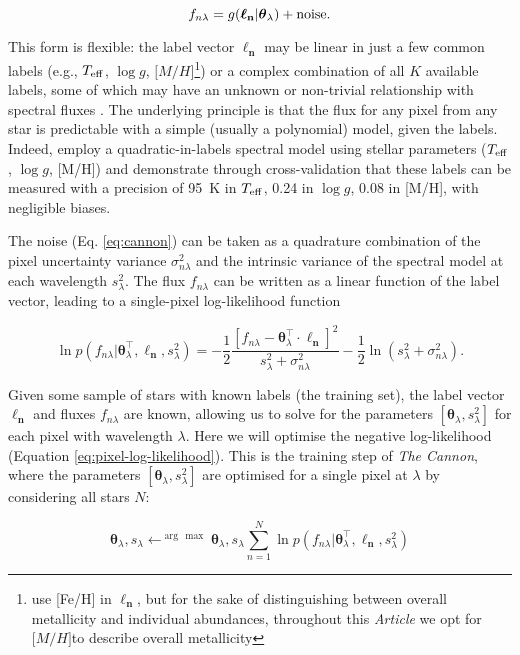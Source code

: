 \documentclass[useAMS,usenatbib]{mn2e}
\newcommand\article{\textit{Article}}
\newcommand\tc{\textit{The Cannon}}
\newcommand\lv{\mathbf{\boldsymbol\ell_n}}
\newcommand\cv{{\boldsymbol\theta}_\lambda}
\newcommand\given{|}
\newcommand\teff{$T_{\rm eff}$}
\newcommand\logg{$\log{g}$}
\newcommand\mh{${\mathrm [M/H]}$}
\begin{document}
\begin{equation}
    f_{n\lambda} = g(\lv\given\cv) + {\rm noise}.
    \label{eq:cannon}
\end{equation}

This form is flexible: the label vector $\lv$ may be linear in just a few common
labels (e.g., \teff, \logg, \mh\footnote{\citet{Ness15a} use [Fe/H] in $\lv$, but for the 
sake of distinguishing between overall metallicity and individual abundances,
throughout this \article{} we opt for \mh to describe overall metallicity})
or a complex combination of all $K$ available labels, some of which may have an
 unknown or non-trivial relationship with spectral fluxes \citep[e.g., ages, 
 masses, see][]{Nissen15, Ness15b}. The underlying principle
is that the flux for any pixel from any star is predictable with a simple (usually
 a polynomial) model, given the labels. Indeed, \citet{Ness15a}
employ a quadratic-in-labels spectral model using stellar
parameters ($T_{\rm eff}$, $\log{g}$, [M/H])
and demonstrate through cross-validation that these labels can be 
measured with a precision of 95~K in $T_{\rm eff}$, 0.24 in $\log{g}$, 0.08 in 
[M/H], with negligible biases. 

The noise (Eq. \ref{eq:cannon}) can be taken as a quadrature combination of the pixel uncertainty variance $\sigma_{n\lambda}^2$ and the intrinsic variance of the spectral model at each wavelength $s_\lambda^2$. The flux $f_{n\lambda}$ can be written as a linear function of the label vector, leading to a single-pixel log-likelihood function

\begin{equation}
\ln{p}\left(f_{n\lambda}\given\cv^\intercal,\lv, s_{\lambda}^2\right) = -\frac{1}{2}\frac{\left[f_{n\lambda} - \cv^{\intercal}\cdot\lv\right]^2}{s_\lambda^2 + \sigma_{n\lambda}^2} -\frac{1}{2}\ln\left(s_{\lambda}^2 + \sigma_{n\lambda}^2\right).
\label{eq:pixel-log-likelihood}
\end{equation}

Given some sample of stars with known labels (the training set), the label vector $\lv$ and fluxes $f_{n\lambda}$ are known, allowing us to solve for the parameters $[\cv,s_\lambda^2]$ for each pixel with wavelength $\lambda$. Here we will optimise the negative log-likelihood (Equation \ref{eq:pixel-log-likelihood}). This is the training step of \tc{}, where the parameters $[\cv,s_\lambda^2]$ are optimised for a single pixel at $\lambda$ by considering all stars $N$:

\begin{equation}
\cv,s_\lambda \leftarrow^{\arg\,\max} {\cv, s_\lambda} \sum_{n=1}^N \ln{p}\left(f_{n\lambda}\given\cv^\intercal,\lv,s_\lambda^2\right)
\end{equation}
\end{document}
